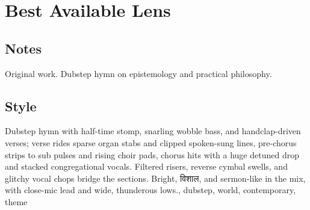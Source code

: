 \section{Best Available Lens}

\subsection{Notes}
Original work.
Dubstep hymn on epistemology and practical philosophy.

\subsection{Style}
Dubstep hymn with half-time stomp, snarling wobble bass, and handclap-driven verses; verse rides sparse organ stabs and clipped spoken-sung lines, pre-chorus strips to sub pulses and rising choir pads, chorus hits with a huge detuned drop and stacked congregational vocals. Filtered risers, reverse cymbal swells, and glitchy vocal chops bridge the sections. Bright, विशाल, and sermon-like in the mix, with close-mic lead and wide, thunderous lows., dubstep, world, contemporary, theme

